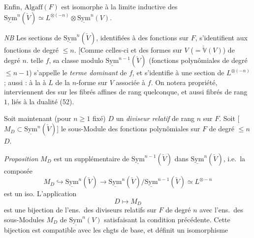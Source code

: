 \documentclass[11pt,a4paper]{article}
\begin{document}

Enfin, $\mathrm{Algaff}(F)$ est isomorphe à la limite inductive des $\underline{\mathrm{Sym}}^n(\check{V}) \simeq L^{\otimes(-n)} \otimes \underline{\mathrm{Sym}}^n(V)$.

\emph{NB} Les sections de $\underline{\mathrm{Sym}}^n(\check{V})$, identifiées à des fonctions sur $F$, s'identifient aux fonctions  de degré $\le n$. [Comme \ill{} \ill{} celles-ci et des formes sur $V$ ($= \check{\mathbb{V}}(V)$) de degré $n$.  telle $f$, sa classe modulo $\underline{\mathrm{Sym}}^{n-1}(\check{V})$ (fonctions polynômiales de degré $\le n - 1$) s'appelle le \emph{terme dominant} de $f$, et s'identifie à une section de $L^{\otimes(-n)}$ ;   aussi : à la  à $L$ de la $n$-forme sur $V$ associée à $f$.
\marginal{!}
On notera  propriété, interviennent  des \ill{}  sur les fibrés affines de rang quelconque, et aussi  fibrés de rang $1$, liés à la dualité (52).

Soit maintenant (pour $n \ge 1$ fixé) $D$ un \emph{diviseur relatif} de rang $n$ sur $F$. Soit
[$M_D \subset \underline{\mathrm{Sym}}^n(\check{V})$] le  sous-Module des fonctions polynômiales sur $F$ de degré $\le n$  $D$.

\emph{Proposition} $M_D$ est un supplémentaire de $\underline{\mathrm{Sym}}^{n-1}(\check{V})$ dans $\underline{\mathrm{Sym}}^n(\check{V})$, i.e.\ la composée
\[
M_D \hookrightarrow \underline{\mathrm{Sym}}^n(\check{V}) \longrightarrow \underline{\mathrm{Sym}}^n(\check{V})/\underline{\mathrm{Sym}}^{n-1}(\check{V}) \simeq L^{\otimes -n}
\]
est un iso. L'application
\[
D \longmapsto M_D
\]
est une bijection de l'ens.\ des diviseurs relatifs sur $F$ de degré $n$ avec l'ens.\ des sous-Modules $M_D$ de $\underline{\mathrm{Sym}}^n(V)$ satisfaisant la condition précédente. Cette bijection est compatible avec les chgts de base, et définit un isomorphisme
\end{document}
